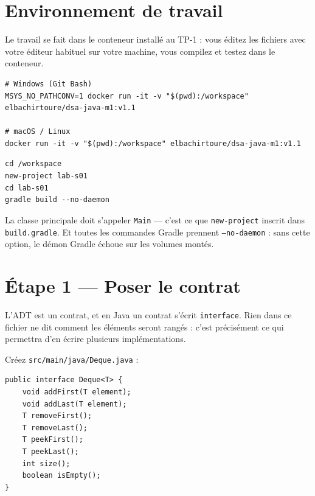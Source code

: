 \documentclass[11pt,a4paper]{article}
\begin{document}
\section{Environnement de travail}

Le travail se fait dans le conteneur installé au TP-1 : vous éditez les
fichiers avec votre éditeur habituel sur votre machine, vous compilez et
testez dans le conteneur.

\begin{lstlisting}[style=bash,caption={Rappel : lancer le conteneur depuis le dossier de travail}]
# Windows (Git Bash)
MSYS_NO_PATHCONV=1 docker run -it -v "$(pwd):/workspace" elbachirtoure/dsa-java-m1:v1.1

# macOS / Linux
docker run -it -v "$(pwd):/workspace" elbachirtoure/dsa-java-m1:v1.1
\end{lstlisting}

\begin{lstlisting}[style=bash,caption={Créer le projet}]
cd /workspace
new-project lab-s01
cd lab-s01
gradle build --no-daemon
\end{lstlisting}

\begin{attentionbox}
La classe principale doit s'appeler \texttt{Main} --- c'est ce que
\texttt{new-project} inscrit dans \texttt{build.gradle}. Et toutes les
commandes Gradle prennent \texttt{--no-daemon} : sans cette option, le
démon Gradle échoue sur les volumes montés.
\end{attentionbox}

\section{Étape 1 --- Poser le contrat}

\begin{lienbox}[Ce qu'on matérialise du CM]
L'ADT est un contrat, et en Java un contrat s'écrit \texttt{interface}. Rien
dans ce fichier ne dit comment les éléments seront rangés : c'est
précisément ce qui permettra d'en écrire plusieurs implémentations.
\end{lienbox}

Créez \texttt{src/main/java/Deque.java} :

\begin{lstlisting}[caption={\texttt{Deque.java} --- le contrat, fourni}]
public interface Deque<T> {
    void addFirst(T element);
    void addLast(T element);
    T removeFirst();
    T removeLast();
    T peekFirst();
    T peekLast();
    int size();
    boolean isEmpty();
}
\end{lstlisting}
\end{document}
